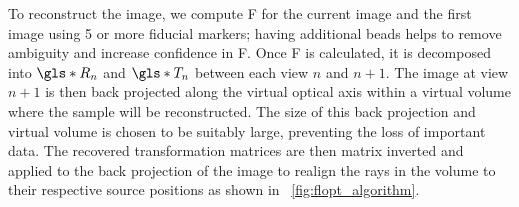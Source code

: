 \documentclass{osa-article}
\begin{document}
To reconstruct the image, we compute \gls*{F} for the current image and the first image using 5 or more fiducial markers; having additional beads helps to remove ambiguity and increase confidence in \gls*{F}.
Once \gls*{F} is calculated, it is decomposed into \(\gls*{R}_n\) and \(\gls*{T}_n\) between each view \(n\) and \(n+1\).
The image at view \(n+1\) is then back projected along the virtual optical axis within a virtual volume where the sample will be reconstructed.
The size of this back projection and virtual volume is chosen to be suitably large, preventing the loss of important data.
The recovered transformation matrices are then matrix inverted and applied to the back projection of the image to realign the rays in the volume to their respective source positions as shown in \figurename~\ref{fig:flopt_algorithm}. %
\end{document}
